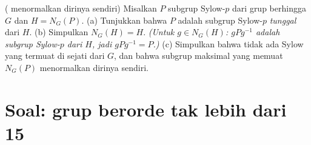 \begin{exercise}[$\star\star$]\label{exo:b3:groups:12}
(  menormalkan dirinya sendiri) Misalkan $P$
subgrup Sylow-$p$ dari grup berhingga $G$ dan $H =
N_G(P)$.
(a) Tunjukkan bahwa $P$ adalah subgrup Sylow-$p$ \emph{tunggal} dari
$H$.
(b) Simpulkan $N_G(H) = H$. \emph{(Untuk $g \in N_G(H)$: $gPg^{-1}$
adalah subgrup Sylow-$p$ dari $H$, jadi $gPg^{-1} = P$.)}
(c) Simpulkan bahwa tidak ada  Sylow yang termuat di  sejati dari $G$, dan bahwa subgrup maksimal yang memuat
$N_G(P)$ menormalkan dirinya sendiri.
\end{exercise}

\section{Soal: grup berorde tak lebih dari 15}

